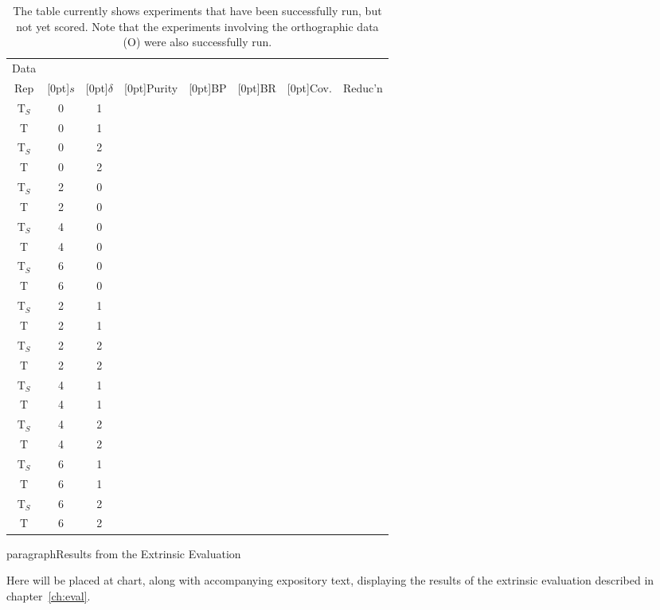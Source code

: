\begin{table}[htb]
\begin{center}
\small
\begin{tabular}{c|cc|ccc |rc}
Data  &  & & &  &  & &  \\ 
  Rep        & \raisebox{1.5ex}[0pt]{$s$} & \raisebox{1.5ex}[0pt]{$\delta$} & \raisebox{1.5ex}[0pt]{Purity} 
  & \raisebox{1.5ex}[0pt]{BP} & \raisebox{1.5ex}[0pt]{BR}                        & \raisebox{1.5ex}[0pt]{Cov.} & Reduc'n \\

\hline
$\text{T}_{S}$ & 0 & 1 & & & & & \\
\rowcolor{LightGray}
$\text{T}$        & 0 & 1 & & & & & \\

$\text{T}_S$   & 0 & 2 & & & & & \\
\rowcolor{LightGray}
$\text{T}$       & 0 & 2 & & & & & \\

$\text{T}_S$         & 2 & 0 & & & & & \\
\rowcolor{LightGray}
$\text{T}$         & 2 & 0 & & & & &  \\

$\text{T}_S$         & 4 & 0 & & & & &  \\
\rowcolor{LightGray}
$\text{T}$         & 4 & 0 & & & & & \\

$\text{T}_{S}$ & 6 & 0 & & & & & \\
\rowcolor{LightGray}
$\text{T}$ & 6 & 0 & & & & & \\
$\text{T}_S$        & 2 & 1 & & & & & \\ 
\rowcolor{LightGray}
$\text{T}$ & 2 & 1 & & & & & \\ 
$\text{T}_S$        & 2 & 2 & & & & & \\ 
\rowcolor{LightGray}
$\text{T}$ & 2 & 2 & & & & & \\ 
$\text{T}_S$        & 4 & 1 & & & & & \\ 
\rowcolor{LightGray}
$\text{T}$ & 4 & 1 & & & & & \\ 
$\text{T}_S$        & 4 & 2 &  & & &  & \\
\rowcolor{LightGray} 
$\text{T}$        & 4 & 2 & & & & & \\
$\text{T}_{S}$ & 6 & 1 & & & & & \\ 
\rowcolor{LightGray}
$\text{T}$        & 6 & 1 & & & & & \\ 
$\text{T}_{S}$ & 6 & 2 & & & & & \\ 
\rowcolor{LightGray}
$\text{T}$        & 6 & 2 & & & & & \\ 
\end{tabular}
\end{center}
\caption{The table currently shows experiments that have been successfully run, but not
yet scored. Note that the experiments involving the orthographic data (O) were also successfully run.}
\label{tab:results}
\end{table}

paragraph{Results from the Extrinsic Evaluation}

Here will be placed at chart, along with accompanying expository text, displaying
the results of the extrinsic evaluation described in chapter~\ref{ch:eval}. 
